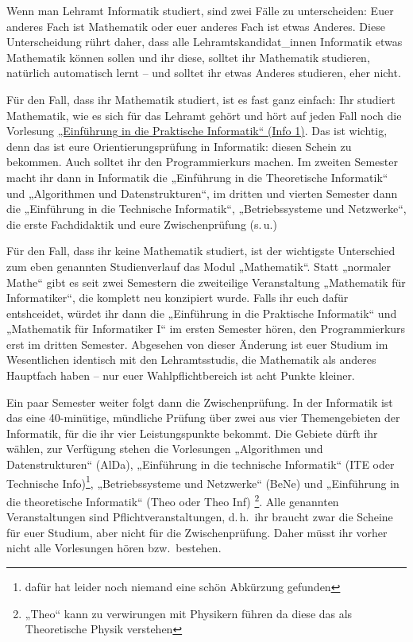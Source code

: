 Wenn man  Lehramt Informatik studiert, sind zwei Fälle zu unterscheiden: Euer anderes
Fach ist Mathematik oder euer anderes Fach ist etwas Anderes. Diese
Unterscheidung rührt daher, dass alle Lehramtskandidat\_innen
Informatik etwas Mathematik können sollen und ihr diese, solltet ihr
Mathematik studieren, natürlich automatisch lernt -- und solltet ihr
etwas Anderes studieren, eher nicht.

Für den Fall, dass ihr Mathematik studiert, ist es fast ganz einfach:
Ihr studiert Mathematik, wie es sich für das Lehramt gehört und hört auf
jeden Fall noch die Vorlesung \hyperref[info1]{„Einführung in die
  Praktische Informatik“ (Info 1)}. Das ist wichtig, denn das ist eure
Orientierungsprüfung in Informatik: diesen Schein zu bekommen. Auch
solltet ihr den Programmierkurs machen. Im zweiten Semester macht ihr
dann in Informatik die „Einführung in die Theoretische Informatik“ und
„Algorithmen und Datenstrukturen“, im dritten und vierten Semester dann die
„Einführung in die Technische Informatik“, „Betriebssysteme und
Netzwerke“, die erste Fachdidaktik und eure Zwischenprüfung (s.\,u.)

Für den Fall, dass ihr keine Mathematik studiert, ist der wichtigste
Unterschied zum eben genannten Studienverlauf das Modul
„Mathematik“. Statt „normaler Mathe“ gibt es seit zwei Semestern die zweiteilige Veranstaltung „Mathematik für
Informatiker“, die komplett neu konzipiert wurde. Falls ihr euch dafür entshceidet, würdet ihr dann die
„Einführung in die Praktische Informatik“ und „Mathematik für Informatiker I“ im ersten Semester
hören, den Programmierkurs erst im dritten Semester. Abgesehen von
dieser Änderung ist euer Studium im Wesentlichen identisch mit den
Lehramtsstudis, die Mathematik als anderes Hauptfach haben -- nur euer
Wahlpflichtbereich ist acht Punkte kleiner.

Ein paar Semester weiter folgt dann die Zwischenprüfung. In der
Informatik ist das eine 40-minütige, mündliche Prüfung über zwei aus
vier Themengebieten der Informatik, für die ihr vier Leistungspunkte
bekommt. Die Gebiete dürft ihr wählen, zur Verfügung stehen die
Vorlesungen „Algorithmen und Datenstrukturen“ (AlDa), „Einführung in
die technische Informatik“ (ITE oder Technische Info)\footnote{dafür hat
leider noch niemand eine schön Abkürzung gefunden}, „Betriebssysteme und Netzwerke“
(BeNe) und „Einführung in die theoretische Informatik“ (Theo oder Theo Inf)
\footnote{„Theo“ kann zu verwirungen mit Physikern führen da diese das als Theoretische Physik verstehen}.
Alle genannten Veranstaltungen sind Pflichtveranstaltungen,
d.\,h.\ ihr braucht zwar die Scheine für euer Studium, aber nicht für
die Zwischenprüfung. Daher müsst ihr vorher nicht alle Vorlesungen
hören bzw.\ bestehen.


